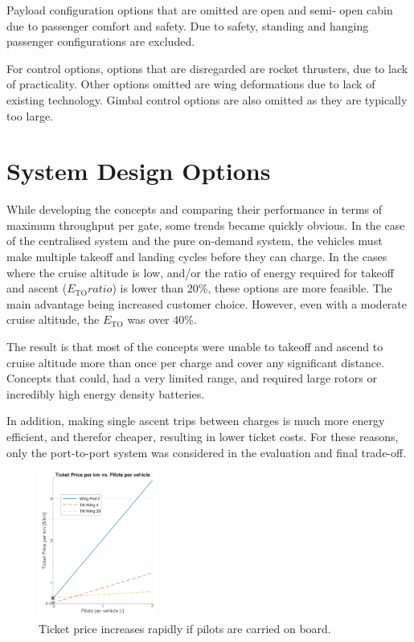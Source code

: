 Payload configuration options that are omitted are open and semi- open cabin due to passenger comfort and safety. Due to safety, standing and hanging passenger configurations are excluded.

For control options, options that are disregarded are rocket thrusters, due to lack of practicality. Other options omitted are wing deformations due to lack of existing technology. Gimbal control options are also omitted as they are typically too large. 

\section{System Design Options}
While developing the concepts and comparing their performance in terms of maximum throughput per gate, some trends became quickly obvious. In the case of the centralised system and the pure on-demand system, the vehicles must make multiple takeoff and landing cycles before they can charge. In the cases where the cruise altitude is low, and/or the ratio of energy required for takeoff and ascent ($E_\text{TO} ratio$) is lower than 20\%, these options are more feasible. The main advantage being increased customer choice. However, even with a moderate cruise altitude, the $E_\text{TO}$ was over 40\%.

The result is that most of the concepts were unable to takeoff and ascend to cruise altitude more than once per charge and cover any significant distance. Concepts that could, had a very limited range, and required large rotors or incredibly high energy density batteries.

In addition, making single ascent trips between charges is much more energy efficient, and therefor cheaper, resulting in lower ticket costs. For these reasons, only the port-to-port system was considered in the evaluation and final trade-off.

\begin{figure}
    \centering
    \includegraphics[width=0.35\textwidth]{Figures/Pilots_TPrice_perkm.png}
    \captionsetup{justification=centering}
    \caption{Ticket price increases rapidly if pilots are carried on board.}
    \label{fig:pilotedcost}
\end{figure}

